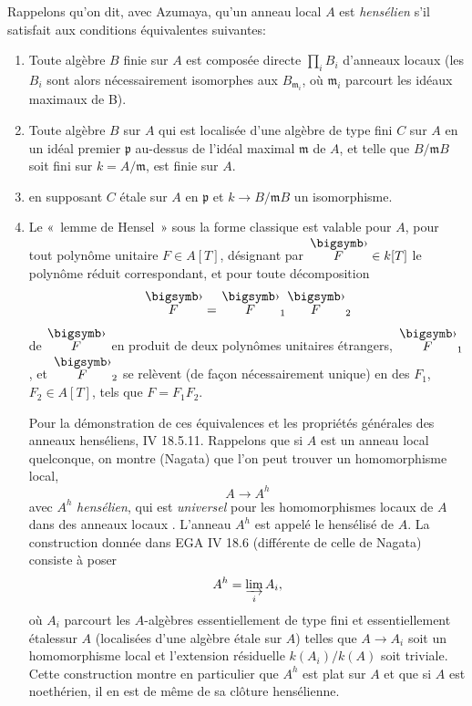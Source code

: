 \documentclass[10pt]{../fichiers-configuration-latex/smfart}
\begin{document}
Rappelons qu'on dit, avec Azumaya, qu'un anneau local $A$ est
\emph{hensélien} s'il satisfait aux conditions équivalentes suivantes:
\begin{enumerate}
\renewcommand{\theenumi}{\roman{enumi}}
\renewcommand{\labelenumi}{(\theenumi)}
\item Toute algèbre $B$ finie sur $A$ est composée directe
$\prod_{i} B_i$ d'anneaux locaux (les $B_i$ sont alors
nécessairement isomorphes aux $B_{\mathfrak{m}_i}$, où\pageoriginale
$\mathfrak{m}_i$ parcourt les idéaux maximaux de B).

\item  Toute algèbre $B$ sur $A$ qui est localisée d'une algèbre de
  type fini $C$ sur $A$ en un idéal premier $\mathfrak{p}$ au-dessus de
  l'idéal maximal $\mathfrak{m}$ de $A$, et telle que $B /\mathfrak{m}
  B$ soit fini sur $k = A / \mathfrak{m}$, est finie sur $A$.

\item {} en supposant $C$ étale sur $A$ en $\mathfrak{p}$
  et $k \to B /\mathfrak{m} B$ un isomorphisme.

\item Le « lemme de Hensel » sous la forme classique est valable
  pour $A$, \ie pour tout polynôme unitaire $F \in A [T]$, désignant
  par $\overset{\bigdot}{F} \in k [T]$ le polynôme réduit correspondant,
  et pour toute décomposition
$$
\overset{\bigdot}{F} = \overset{\bigdot}{F}_1 \overset{\bigdot}{F}_2
$$
de $\overset{\bigdot}{F}$ en produit de deux polynômes unitaires
étrangers, $\overset{\bigdot}{F}_1$, et $\overset{\bigdot}{F}_2$ se
relèvent (de façon nécessairement unique) en des $F_1$, $F_2 \in A
[T]$, tels que $F = F_1 F_2$.

Pour la démonstration de ces équivalences et les propriétés générales
des anneaux henséliens, \cf \EGA IV 18.5.11. Rappelons que si $A$ est
un anneau local quelconque, on montre (Nagata) que l'on peut trouver
un homomorphisme local,
$$
A \to A^{h}
$$
avec $A^{h}$ \emph{hensélien}, qui est \emph{universel} pour les
homomorphismes locaux de $A$ dans des anneaux locaux
. L'anneau $A^h$ est appelé le hensélisé de $A$. La
construction donnée dans EGA IV 18.6 (différente de celle de Nagata)
consiste à poser
$$
A^h = \varinjlim_i A_i{},
$$
où $A_i$ parcourt les $A$-algèbres essentiellement de type fini et
essentiellement étales\pageoriginale sur $A$ (\ie localisées d'une
algèbre étale sur $A$) telles que $A \to A_i$ soit un homomorphisme
local et l'extension résiduelle $k(A_i) / k(A)$ soit triviale. Cette
construction montre en particulier que $A^h$ est plat sur $A$ et que
si $A$ est noethérien, il en est de même de sa clôture
hensélienne.
\end{enumerate}
\end{document}
